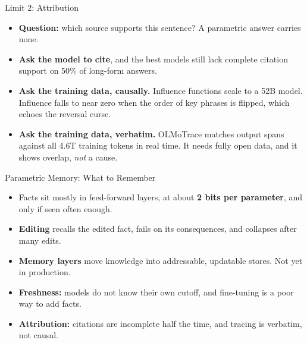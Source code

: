 \begin{frame}{Limit 2: Attribution}
    \begin{itemize}\itemsep0.5em
        \item \textbf{Question:} which source supports this sentence? A parametric answer carries none.
        \item \textbf{Ask the model to cite}, and the best models still lack complete citation support on \alert{50\%} of long-form answers.
        \item \textbf{Ask the training data, causally.} Influence functions scale to a 52B model. Influence falls to near zero when the order of key phrases is flipped, which echoes the reversal curse.
        \item \textbf{Ask the training data, verbatim.} OLMoTrace matches output spans against all 4.6T training tokens in real time. It needs fully open data, and it shows overlap, \emph{not} a cause.
    \end{itemize}
    \vspace{0.3em}
\end{frame}

\begin{frame}{Parametric Memory: What to Remember}
    \begin{itemize}\itemsep0.55em
        \item Facts sit mostly in feed-forward layers, at about \textbf{2 bits per parameter}, and only if seen often enough.
        \item \textbf{Editing} recalls the edited fact, fails on its consequences, and collapses after many edits.
        \item \textbf{Memory layers} move knowledge into addressable, updatable stores. Not yet in production.
        \item \textbf{Freshness:} models do not know their own cutoff, and fine-tuning is a poor way to add facts.
        \item \textbf{Attribution:} citations are incomplete half the time, and tracing is verbatim, not causal.
    \end{itemize}
    \vspace{0.4em}
\end{frame}
